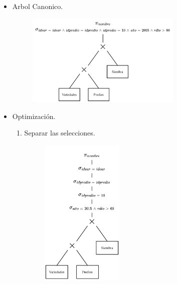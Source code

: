 \documentclass{templateNote}
\begin{document}
\begin{enumerate}
\begin{itemize}
        \newpage
        \item Arbol Canonico.
        \begin{figure}[H]
            \centering
            \includegraphics[width=0.7\textwidth]{img/E1-Canonico.png}
        \end{figure}

        \item Optimizaci\'on.
        \begin{enumerate}
            \item Separar las selecciones.
            \begin{figure}[H]
                \centering
                \includegraphics[width=0.4\textwidth]{img/E1-Paso-1.png}
            \end{figure}


\end{enumerate}
\end{itemize}
\end{enumerate}
\end{document}
